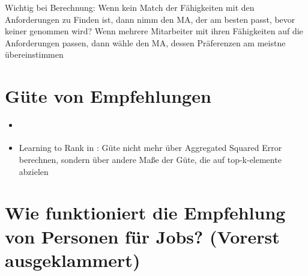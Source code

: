 Wichtig bei Berechnung: Wenn kein Match der Fähigkeiten mit den Anforderungen zu Finden ist, dann nimm den MA, der am besten passt, bevor keiner genommen wird?
Wenn mehrere Mitarbeiter mit ihren Fähigkeiten auf die Anforderungen passen, dann wähle den MA, dessen Präferenzen am meistne übereinstimmen

\newpage

\section{Güte von Empfehlungen}
\begin{itemize}
    \item \textcite[]{klahold:book}
    \item Learning to Rank in \textcite[S. 413ff]{recommenderSystems:2016}: Güte nicht mehr über Aggregated Squared Error berechnen, sondern über andere Maße der Güte, die auf top-k-elemente abzielen
\end{itemize}

\section{Wie funktioniert die Empfehlung von Personen für Jobs? (Vorerst ausgeklammert)}
\label{ch:notizen:maEmpfehlung}

